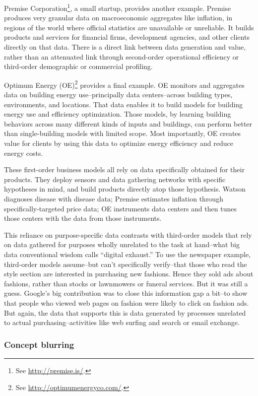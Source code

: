 \documentclass[12pt]{article}
\begin{document}
Premise Corporation\footnote{See \url{http://premise.is/}.}, a small startup, provides another
example. Premise produces very granular data on macroeconomic
aggregates like inflation, in regions of the world where official
statistics are unavailable or unreliable. It builds products and
services for financial firms, development agencies, and other clients
directly on that data. There is a direct link between data
generation and value, rather than an attenuated link through
second-order operational efficiency or third-order demographic or
commercial profiling. 

Optimum Energy (OE)\footnote{See \url{http://optimumenergyco.com/}.} provides a final example. OE monitors and
aggregates data on building energy use--principally data
centers--across building types, environments, and locations. That data
enables it to build models for building energy use and efficiency
optimization. Those models, by learning building behaviors across many
different kinds of inputs and buildings, can perform better than
single-building models with limited scope. Most importantly, OE
creates value for clients by using this data to optimize energy
efficiency and reduce energy costs.

These first-order business models all rely on data specifically
obtained for their products. They deploy sensors and data gathering
networks with specific hypotheses in mind, and build products directly
atop those hypothesis. Watson diagnoses disease with disease data;
Premise estimates inflation through specifically-targeted price data;
OE instruments data centers and then tunes those centers with the data
from those instruments.

This reliance on purpose-specific data contrasts with third-order
models that rely on data gathered for purposes wholly unrelated to the
task at hand--what big data conventional wisdom calls ``digital
exhaust.'' To use the newspaper example, third-order models
assume--but can't specifically verify--that those who read the style
section are interested in purchasing new fashions. Hence they sold ads
about fashions, rather than stocks or lawnmowers or funeral
services. But it was still a guess. Google's big contribution was to
close this information gap a bit--to show that people who viewed web
pages on fashion were likely to click on fashion ads. But again, the
data that supports this is data generated by processes unrelated to
actual purchasing--activities like web surfing and search or email
exchange. 


\subsubsection{Concept blurring}
\label{sec:concept-blurring}
\end{document}
